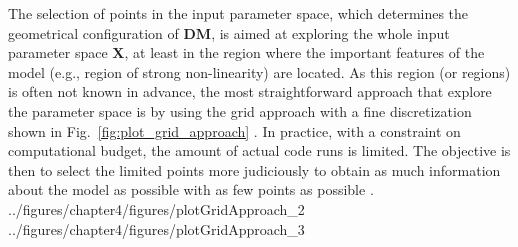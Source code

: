 The selection of points in the input parameter space, which determines the geometrical configuration of $\mathbf{DM}$, is aimed at exploring the whole input parameter space $\bm{X}$, at least in the region where the important features of the model (e.g., region of strong non-linearity) are located.
As this region (or regions) is often not known in advance, 
the most straightforward approach that explore the parameter space is by using the grid approach with a fine discretization shown in Fig.~\ref{fig:plot_grid_approach} \cite{Koehler1996}.
In practice, with a constraint on computational budget, the amount of actual code runs is limited.
The objective is then to select the limited points more judiciously to obtain as much information about the model as possible with as few points as possible \cite{Simpson2001a,Fang2006}.  
{../figures/chapter4/figures/plotGridApproach_2}
{../figures/chapter4/figures/plotGridApproach_3}

